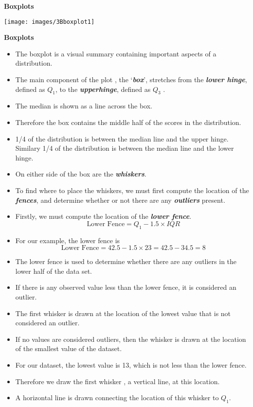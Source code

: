 \documentclass[]{report}
\begin{document}
{
\textbf{Boxplots}

\begin{center}
\texttt{[image: images/3Bboxplot1]}
\end{center}
}

{
\textbf{Boxplots}
\begin{itemize}
\item  The boxplot is a visual summary containing important aspects of a distribution. \item  The main component of the plot , the `\textbf{\emph{box}}', stretches from the \textbf{\emph{lower hinge}}, defined as $Q_1$, to the \textbf{\emph{upperhinge}}, defined as $Q_3$ .
\item  The median is shown as a line across the box.
\item  Therefore the box contains the middle half of the scores in the distribution.
\item   1/4 of the distribution is between the median line and the upper hinge. Similary 1/4 of the distribution is between the median line and the lower hinge.
\end{itemize}

\begin{itemize}
\item  On either side of the box are the \textbf{\emph{whiskers}}.
\item  To find where to place the whiskers, we must first compute the location of the \textbf{\emph{fences}}, and determine whether or not there are any \textbf{\emph{outliers}} present.
\item  Firstly, we must compute the location of the \textbf{\emph{lower fence}}.
\[ \mbox{ Lower Fence}  = Q_1 - 1.5 \times IQR \]
\item  For our example, the lower fence is
\[ \mbox{ Lower Fence}  = 42.5 - 1.5 \times 23  = 42.5 - 34.5 = 8 \]

\end{itemize}

\begin{itemize}
\item  The lower fence is used to determine whether there are any outliers in the lower half of the data set.
\item  If there is any observed value less than the lower fence, it is considered an outlier.
\item  The first whisker is drawn at the location of the lowest value that is not considered an outlier.
\item  If no values are considered outliers, then the whisker is drawn at the location of the smallest value of the dataset.
\item  For our dataset, the lowest value is 13, which is not less than the lower fence.
\item  Therefore we draw the first whisker , a vertical line, at this location.
\item  A horizontal line is drawn connecting the location of this whisker to $Q_1$.
\end{itemize}
}
\end{document}
